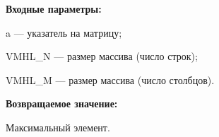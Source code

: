 \textbf{Входные параметры:}

 a --- указатель на матрицу;
 
 VMHL\_N --- размер массива (число строк);
 
 VMHL\_M --- размер массива (число столбцов).

\textbf{Возвращаемое значение:}

 Максимальный элемент.